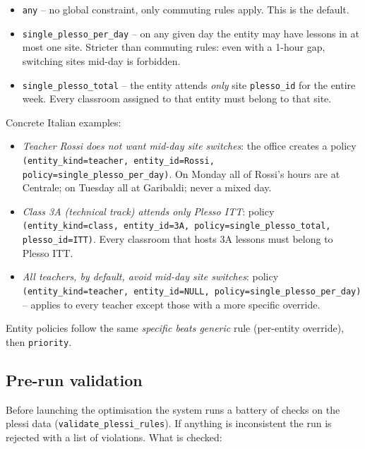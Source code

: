 \begin{itemize}
\item \texttt{any} -- no global constraint, only commuting
rules apply. This is the default.
\item \texttt{single\_plesso\_per\_day} -- on any given day
the entity may have lessons in at most one site. Stricter
than commuting rules: even with a 1-hour gap, switching
sites mid-day is forbidden.
\item \texttt{single\_plesso\_total} -- the entity attends
\emph{only} site \texttt{plesso\_id} for the entire week.
Every classroom assigned to that entity must belong to
that site.
\end{itemize}

Concrete Italian examples:

\begin{itemize}
\item \emph{Teacher Rossi does not want mid-day site
switches}: the office creates a policy
\texttt{(entity\_kind=teacher, entity\_id=Rossi,
policy=single\_plesso\_per\_day)}. On Monday all of
Rossi's hours are at Centrale; on Tuesday all at
Garibaldi; never a mixed day.
\item \emph{Class 3A (technical track) attends only Plesso
ITT}: policy \texttt{(entity\_kind=class,
entity\_id=3A, policy=single\_plesso\_total,
plesso\_id=ITT)}. Every classroom that hosts 3A lessons
must belong to Plesso ITT.
\item \emph{All teachers, by default, avoid mid-day site
switches}: policy \texttt{(entity\_kind=teacher,
entity\_id=NULL, policy=single\_plesso\_per\_day)} --
applies to every teacher except those with a more
specific override.
\end{itemize}

Entity policies follow the same \emph{specific beats
generic} rule (per-entity override), then \texttt{priority}.

\subsection{Pre-run validation}

Before launching the optimisation the system runs a battery
of checks on the plessi data
(\texttt{validate\_plessi\_rules}). If anything is
inconsistent the run is rejected with a list of violations.
What is checked:

